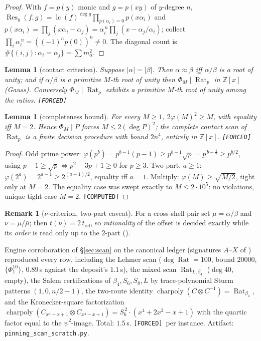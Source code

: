 \documentclass[11pt]{article}
\newcommand{\F}{\textnormal{\texttt{[FORCED]}}}
\newcommand{\C}{\textnormal{\texttt{[COMPUTED]}}}
\newcommand{\Z}{\mathbb{Z}}
\newcommand{\Rat}{\operatorname{Rat}}
\newcommand{\Res}{\operatorname{Res}}
\newcommand{\lc}{\operatorname{lc}}
\newtheorem{lemma}[theorem]{Lemma}
\theoremstyle{definition}
\newtheorem{remark}[theorem]{Remark}
\begin{document}
\begin{proof}
With $f=p(y)$ monic and $g=p(xy)$ of $y$-degree $n$,
$\Res_y(f,g)=\lc(f)^{\deg g}\prod_{p(\alpha_i)=0}p(x\alpha_i)$ and
$p(x\alpha_i)=\prod_j(x\alpha_i-\alpha_j)=\alpha_i^{\,n}\prod_j(x-\alpha_j/\alpha_i)$;
collect $\prod_i\alpha_i^{\,n}=((-1)^np(0))^n\neq0$. The diagonal count is
$\#\{(i,j):\alpha_i=\alpha_j\}=\sum m_\alpha^2$.
\end{proof}

\begin{lemma}[contact criterion]\label{lem:contact}
Suppose $|\alpha|=|\beta|$. Then $\alpha\approx\beta$ iff $\alpha/\beta$ is a
root of unity; and if $\alpha/\beta$ is a primitive $M$-th root of unity then
$\Phi_M\mid\Rat_p$ in $\Z[x]$ (Gauss). Conversely $\Phi_M\mid\Rat_p$ exhibits a
primitive $M$-th root of unity among the ratios. \F
\end{lemma}

\begin{lemma}[completeness bound]\label{lem:totient}
For every $M\ge1$, $2\varphi(M)^2\ge M$, with equality iff $M=2$. Hence
$\Phi_M\mid P$ forces $M\le 2(\deg P)^2$; the complete contact scan of $\Rat_p$
is a finite decision procedure with bound $2n^4$, entirely in $\Z[x]$. \F
\end{lemma}

\begin{proof}
Odd prime power: $\varphi(p^b)=p^{b-1}(p-1)\ge p^{b-1}\sqrt{p}=p^{\,b-\frac12}\ge p^{b/2}$,
using $p-1\ge\sqrt p\iff p^2-3p+1\ge0$ for $p\ge3$. Two-part, $a\ge1$:
$\varphi(2^a)=2^{a-1}\ge 2^{(a-1)/2}$, equality iff $a=1$. Multiply:
$\varphi(M)\ge\sqrt{M/2}$, tight only at $M=2$. The equality case was swept
exactly to $M\le 2\cdot10^{5}$: no violations, unique tight case $M=2$. \C
\end{proof}

\begin{remark}[$\nu$-criterion, two-part caveat]\label{rem:nu2part}
For a cross-shell pair set $\mu=\alpha/\beta$ and $\nu=\mu/\bar\mu$; then
$t(\nu)=2\,t_{\mathrm{rel}}$, so \emph{rationality} of the offset is decided
exactly while its \emph{order} is read only up to the $2$-part
(\cite[Rem.~7.6]{relcharge}).
\end{remark}

Engine corroboration of \S\ref{sec:scan} on the canonical ledger (signatures
$A$--$X$ of \cite{relcharge}) reproduced every row, including the Lehmer scan
($\deg\Rat=100$, bound $20000$, $\{\Phi_1^{10}\}$, $0.89$\,s against the
deposit's $1.1$\,s), the mixed scan $\Rat_{L,\beta_4}$ ($\deg 40$, empty), the
Salem certifications of $\beta_4,S_6,S_8,L$ by trace-polynomial Sturm patterns
$(1,0,n/2-1)$, the two-route identity
$\operatorname{charpoly}(C\otimes C^{-1})=\Rat_{\beta_4}$, and the
Kronecker-square factorization
$\operatorname{charpoly}(C_{x^4-x+1}\otimes C_{x^4-x+1})=S_6^{\,2}\cdot(x^4+2x^2-x+1)$
with the quartic factor equal to the $\psi^2$-image. Total: $1.5$\,s. \F\ per
instance. Artifact: \texttt{pinning\_scan\_scratch.py}.
\end{document}
